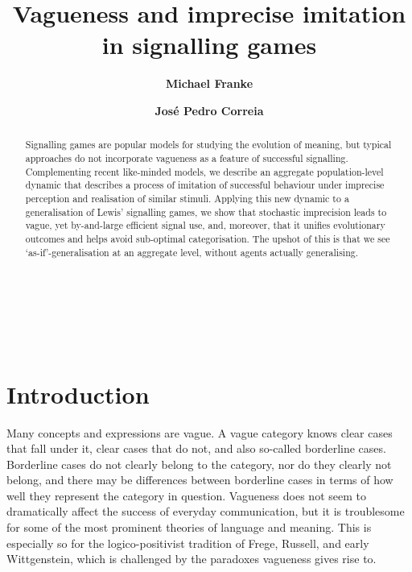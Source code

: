 \documentclass[12pt,english]{article}
\numberwithin{equation}{section}
\begin{document}
\title{{\normalsize \textbf{Vagueness and imprecise imitation in signalling games}}}
\author{{\normalsize \textbf{Michael Franke}} \and {\normalsize \textbf{Jos\'e Pedro Correia}}}
\date{}

\maketitle

\thispagestyle{empty}

\begin{abstract}
  Signalling games are popular models for studying the evolution of meaning, but typical
  approaches do not incorporate vagueness as a feature of successful signalling.  Complementing
  recent like-minded models, we describe an aggregate population-level dynamic that describes a
  process of imitation of successful behaviour under imprecise perception and realisation of
  similar stimuli. Applying this new dynamic to a generalisation of Lewis' signalling games, we
  show that stochastic imprecision leads to vague, yet by-and-large efficient signal use, and,
  moreover, that it unifies evolutionary outcomes and helps avoid sub-optimal
  categorisation. The upshot of this is that we see `as-if'-generalisation at an aggregate
  level, without agents actually generalising.
\end{abstract}

\mbox{} \\

\tableofcontents

\mbox{} \\

\section{Introduction}
\label{sec:introduction}

Many concepts and expressions are vague. A vague category knows clear cases that fall under it,
clear cases that do not, and also so-called borderline cases. Borderline cases do not clearly
belong to the category, nor do they clearly not belong, and there may be differences between borderline cases in
terms of how well they represent the category in question. Vagueness does not seem to
dramatically affect the success of everyday communication, but it is troublesome for some of
the most prominent theories of language and meaning. This is especially so for the
logico-positivist tradition of Frege, Russell, and early Wittgenstein, which is challenged by
the paradoxes vagueness gives rise to.
\end{document}
